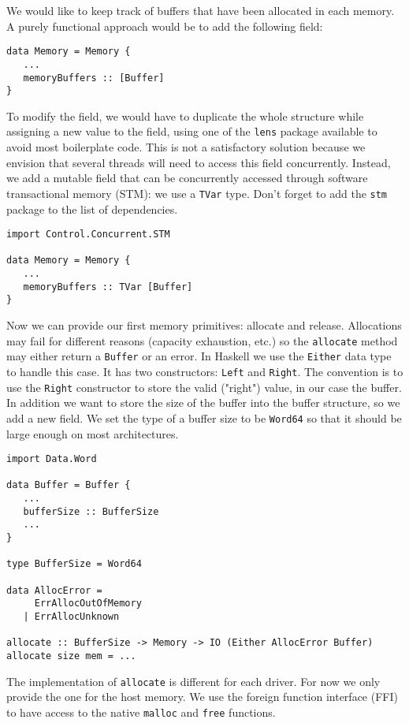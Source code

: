 We would like to keep track of buffers that have been allocated in each memory.
A purely functional approach would be to add the following field:
\begin{lstlisting}
data Memory = Memory {
   ...
   memoryBuffers :: [Buffer]
}
\end{lstlisting}

To modify the field, we would have to duplicate the whole structure while
assigning a new value to the field, using one of the \texttt{lens} package
available to avoid most boilerplate code. This is not a satisfactory solution
because we envision that several threads will need to access this field
concurrently.  Instead, we add a mutable field that can be concurrently accessed
through software transactional memory (STM): we use a \texttt{TVar} type. Don't
forget to add the \texttt{stm} package to the list of dependencies.

\begin{lstlisting}
import Control.Concurrent.STM

data Memory = Memory {
   ...
   memoryBuffers :: TVar [Buffer]
}
\end{lstlisting}

Now we can provide our first memory primitives: allocate and release.
Allocations may fail for different reasons (capacity exhaustion, etc.) so the
\texttt{allocate} method may either return a \texttt{Buffer} or an error. In
Haskell we use the \texttt{Either} data type to handle this case. It has two
constructors: \texttt{Left} and \texttt{Right}. The convention is to use the
\texttt{Right} constructor to store the valid ("right") value, in our case the
buffer. In addition we want to store the size of the buffer into the buffer
structure, so we add a new field. We set the type of a buffer size to be
\texttt{Word64} so that it should be large enough on most architectures.


\begin{lstlisting}
import Data.Word

data Buffer = Buffer {
   ...
   bufferSize :: BufferSize
   ...
}

type BufferSize = Word64

data AllocError = 
     ErrAllocOutOfMemory
   | ErrAllocUnknown

allocate :: BufferSize -> Memory -> IO (Either AllocError Buffer)
allocate size mem = ...
\end{lstlisting}

The implementation of \texttt{allocate} is different for each driver. For now we
only provide the one for the host memory. We use the foreign function interface
(FFI) to have access to the native \texttt{malloc} and \texttt{free} functions.

